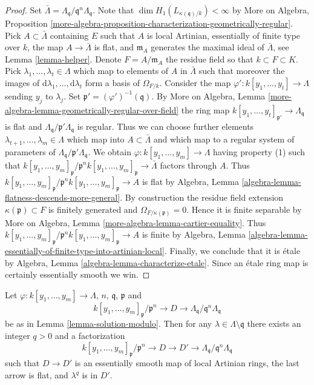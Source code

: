 \begin{proof}
Set $\bar \Lambda = \Lambda_\mathfrak q/\mathfrak q^n\Lambda_\mathfrak q$.
Note that $\dim H_1(L_{\kappa(\mathfrak q)/k}) < \infty$ by
More on Algebra, Proposition
\ref{more-algebra-proposition-characterization-geometrically-regular}.
Pick $A \subset \bar \Lambda$ containing $E$ such that $A$ is local
Artinian, essentially of finite type over $k$, the map
$A \to \bar \Lambda$ is flat, and $\mathfrak m_A$ generates the maximal
ideal of $\bar \Lambda$, see Lemma \ref{lemma-helper}.
Denote $F = A/\mathfrak m_A$ the residue field so that $k \subset F \subset K$.
Pick $\lambda_1, \ldots, \lambda_t \in \Lambda$ which map
to elements of $A$ in $\bar \Lambda$ such that moreover the images
of $\text{d}\lambda_1, \ldots, \text{d}\lambda_t$ form a basis
of $\Omega_{F/k}$. Consider the map
$\varphi' : k[y_1, \ldots, y_t] \to \Lambda$ sending $y_j$ to $\lambda_j$.
Set $\mathfrak p' = (\varphi')^{-1}(\mathfrak q)$. By
More on Algebra, Lemma
\ref{more-algebra-lemma-geometrically-regular-over-field}
the ring map $k[y_1, \ldots, y_t]_{\mathfrak p'} \to \Lambda_\mathfrak q$
is flat and $\Lambda_\mathfrak q/\mathfrak p' \Lambda_\mathfrak q$ is
regular. Thus we can choose further elements
$\lambda_{t + 1}, \ldots, \lambda_m \in \Lambda$
which map into $A \subset \bar \Lambda$ and which
map to a regular system of parameters of
$\Lambda_\mathfrak q/\mathfrak p' \Lambda_\mathfrak q$.
We obtain $\varphi : k[y_1, \ldots, y_m] \to \Lambda$ having
property (1) such that
$k[y_1, \ldots, y_m]_\mathfrak p/\mathfrak p^n k[y_1, \ldots, y_m]_\mathfrak p
\to \bar\Lambda$
factors through $A$. Thus
$k[y_1, \ldots, y_m]_\mathfrak p/\mathfrak p^n k[y_1, \ldots, y_m]_\mathfrak p
\to A$ is flat by
Algebra, Lemma \ref{algebra-lemma-flatness-descends-more-general}.
By construction the residue field extension $\kappa(\mathfrak p) \subset F$
is finitely generated and $\Omega_{F/\kappa(\mathfrak p)} = 0$. Hence it is
finite separable by
More on Algebra, Lemma \ref{more-algebra-lemma-cartier-equality}.
Thus
$k[y_1, \ldots, y_m]_\mathfrak p/\mathfrak p^n k[y_1, \ldots, y_m]_\mathfrak p
\to A$
is finite by Algebra, Lemma
\ref{algebra-lemma-essentially-of-finite-type-into-artinian-local}.
Finally, we conclude that it is \'etale by
Algebra, Lemma \ref{algebra-lemma-characterize-etale}.
Since an \'etale ring map is certainly essentially smooth we win.
\end{proof}

\begin{lemma}
\label{lemma-enlarge-solution-modulo}
Let $\varphi : k[y_1, \ldots, y_m] \to \Lambda$, $n$, $\mathfrak q$,
$\mathfrak p$ and
$$
k[y_1, \ldots, y_m]_\mathfrak p/\mathfrak p^n \to
D \to \Lambda_\mathfrak q/\mathfrak q^n \Lambda_\mathfrak q
$$
be as in Lemma \ref{lemma-solution-modulo}. Then for any
$\lambda \in \Lambda \setminus \mathfrak q$
there exists an integer $q > 0$ and a factorization
$$
k[y_1, \ldots, y_m]_\mathfrak p/\mathfrak p^n \to
D \to D' \to \Lambda_\mathfrak q/\mathfrak q^n \Lambda_\mathfrak q
$$
such that $D \to D'$ is an essentially smooth map of local Artinian rings,
the last arrow is flat, and $\lambda^q$ is in $D'$.
\end{lemma}

